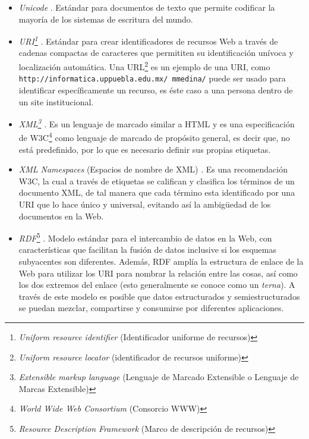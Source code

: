 \begin{itemize}
    \item \textit{Unicode} \cite{W3C}. Estándar para documentos de texto que permite codificar la mayoría de los sistemas de escritura del mundo.
    
    \item \textit{URI\footnote{\textit{Uniform resource identifier} (Identificador uniforme de recursos)}} \cite{W3C}. Estándar para crear identificadores de recursos Web a través de cadenas compactas de caracteres que permititen su identificación unívoca y localización automática. Una URL\footnote{\textit{Uniform resource locator} (identificador de recursos uniforme)} es un ejemplo de una URI, como \texttt{http://informatica.uppuebla.edu.mx/~mmedina/} puede ser usado para identificar específicamente un recurso, es éste caso a una persona dentro de un site institucional.
    
    \item \textit{XML\footnote{\textit{Extensible markup language} (Lenguaje de Marcado Extensible o Lenguaje de Marcas Extensible)}} \cite{W3C}. Es un lenguaje de marcado similar a HTML y es una especificación de W3C\footnote{\textit{World Wide Web Consortium} (Consorcio WWW)} como lenguaje de marcado de propósito general, es decir que, no está predefinido, por lo que es necesario definir sus propias etiquetas. 
    
    \item \textit{XML Namespaces} (Espacios de nombre de XML) \cite{W3C}. Es una recomendación W3C, la cual a través de etiquetas se califican y clasifica los términos de un documento XML, de tal manera que cada término esta identificado por una URI que lo hace único y universal, evitando así la ambigüedad de los documentos en la Web.
    
    \item \textit{RDF}\footnote{\textit{Resource Description Framework} (Marco de descripción de recursos)} \cite{W3C_SemanticWeb}. Modelo estándar para el intercambio de datos en la Web, con características que facilitan la fusión de datos inclusive si los esquemas subyacentes son diferentes. Además, RDF amplía la estructura de enlace de la Web para utilizar los URI para nombrar la relación entre las cosas, así como los dos extremos del enlace (esto generalmente se conoce como un \textit{terna}). A través de este modelo es posible que datos estructurados y semiestructurados se puedan mezclar, compartirse y consumirse por diferentes aplicaciones.
    

\end{itemize}

